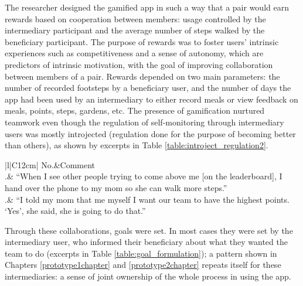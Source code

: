 The researcher designed the gamified app in such a way that a pair would earn rewards based on cooperation between members: usage controlled by the intermediary participant and the average number of steps walked by the beneficiary participant. The purpose of rewards was to foster users' intrinsic experiences such as competitiveness and a sense of autonomy, which are predictors of intrinsic motivation, with the goal of improving collaboration between members of a pair. Rewards depended on two main parameters: the number of recorded footsteps by a beneficiary user, and the number of days the app had been used by an intermediary to either record meals or view feedback on meals, points, steps, gardens, etc. The presence of gamification nurtured teamwork even though the regulation of self-monitoring through intermediary users was mostly introjected (regulation done for the purpose of becoming better than others), as shown by excerpts in Table \ref{table:introject_regulation2}.

\begin{table}[h!]
\renewcommand{\baselinestretch}{1.5}
  \begin{center}
    \caption{Excerpts: examples of teamwork as a result of competition from others.}
    \label{table:introject_regulation2}
	\begin{tabular}{|l|C{12cm}|}
		\hline
		No.&Comment\\
		.& {``When I see other people trying to come above me [on the leaderboard], I hand over the phone to my mom so she can walk more steps.''}~\citep{katule2016family}\\
		.& {``I told my mom that me myself I want our team to have the highest points. `Yes', she said, she is going to do that.''}~\citep{katule2016family}\\
		\hline
	\end{tabular}
  \end{center}
\end{table}

Through these collaborations, goals were set. In most cases they were set by the intermediary user, who informed their beneficiary about what they wanted the team to do (excerpts in Table \ref{table:goal_formulation}); a pattern shown in Chapters \ref{prototype1chapter} and \ref{prototype2chapter} repeats itself for these intermediaries: a sense of joint ownership of the whole process in using the app. 

